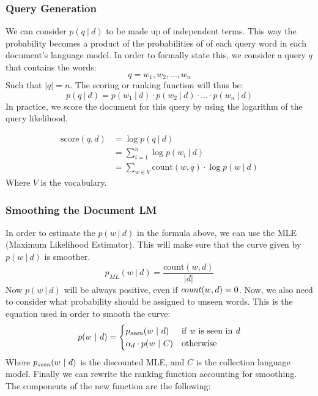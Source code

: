 \documentclass{article}
\begin{document}
\subsubsection{Query Generation}
We can consider $p(q~|~d)$ to be made up of independent terms. This way the probability becomes a product of the probabilities of of each query word in each document's language model. In order to formally state this, we consider a query $q$ that contains the words:
\[ q = w_1, w_2, ..., w_n \]
Such that $|q| = n$. The scoring or ranking function will thus be:
\[ p(q~|~d) = p(w_1~|~d) \cdot p(w_2~|~d) \cdot ... \cdot p(w_n~|~d) \]
In practice, we score the document for this query by using the logarithm of the query likelihood.

\begin{align*}
	\text{score}(q,d) & = \log p(q~|~d) \\
	& = \sum^{n}_{i=1} \log p(w_i~|~d) \\
	& = \sum_{w \in V} \text{count}(w, q) \cdot \log p(w~|~d)
\end{align*}
Where $V$ is the vocabulary.

\subsubsection{Smoothing the Document LM}
In order to estimate the $p(w~|~d)$ in the formula above, we can use the MLE (Maximum Likelihood Estimator). This will make sure that the curve given by $p(w~|~d)$ is smoother.
\[ p_{ML}(w~|~d) = \frac{\text{count}(w, d)}{|d|} \]
Now $p(w~|~d)$ will be always positive, even if $\text{\textit{count}}(w, d) = 0$. Now, we also need to consider what probability should be assigned to unseen words. This is the equation used in order to smooth the curve:
\[ p(w~|~d) = \begin{cases} p_{\text{\textit{seen}}}(w~|~d) & \text{if \textit{w} is seen in \textit{d}} \\ \alpha_d \cdot p(w~|~C) & \text{otherwise} \end{cases} \]
Where $p_{\text{\textit{seen}}}(w~|~d)$ is the discounted MLE, and $C$ is the collection language model. Finally we can rewrite the ranking function accounting for smoothing. The components of the new function are the following:
\end{document}
